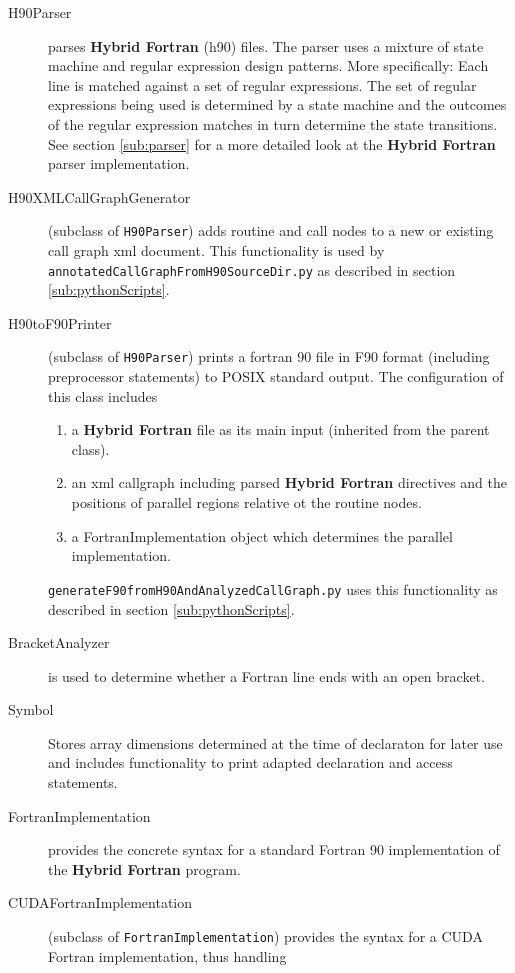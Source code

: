 \begin{description}
 \item[H90Parser] parses \textbf{Hybrid Fortran} (h90) files. The parser uses a mixture of state machine and regular expression design patterns. More specifically: Each line is matched against a set of regular expressions. The set of regular expressions being used is determined by a state machine and the outcomes of the regular expression matches in turn determine the state transitions. 
 See section \ref{sub:parser} for a more detailed look at the \textbf{Hybrid Fortran} parser implementation.
 \item[H90XMLCallGraphGenerator] (subclass of \verb|H90Parser|) adds routine and call nodes to a new or existing call graph xml document. This functionality is used by \linebreak 
 \verb|annotatedCallGraphFromH90SourceDir.py| as described in section \ref{sub:pythonScripts}. 
 \item[H90toF90Printer] (subclass of \verb|H90Parser|) prints a fortran 90 file in F90 format (including preprocessor statements) to POSIX standard output. The configuration of this class includes
  \begin{enumerate}
    \item a \textbf{Hybrid Fortran} file as its main input (inherited from the parent class).
    \item an xml callgraph including parsed \textbf{Hybrid Fortran} directives and the positions of parallel regions relative ot the routine nodes.
    \item a FortranImplementation object which determines the parallel implementation.
  \end{enumerate}
  \verb|generateF90fromH90AndAnalyzedCallGraph.py| uses this functionality as described in section \ref{sub:pythonScripts}.
 \item[BracketAnalyzer] is used to determine whether a Fortran line ends with an open bracket. 
 \item[Symbol] Stores array dimensions determined at the time of declaraton for later use and includes functionality to print adapted declaration and access statements.
 \item[FortranImplementation] provides the concrete syntax for a standard Fortran 90 implementation of the \textbf{Hybrid Fortran} program.
 \item[CUDAFortranImplementation] (subclass of \verb|FortranImplementation|) provides the syntax for a CUDA Fortran implementation, thus handling 
 \begin{itemize}

\end{itemize}
\end{description}
